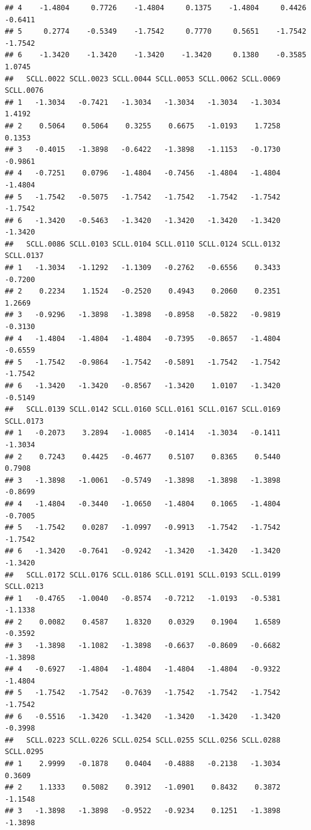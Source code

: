 \documentclass[
]{article}
\begin{document}
\begin{verbatim}
## 4    -1.4804     0.7726    -1.4804     0.1375    -1.4804     0.4426   -0.6411
## 5     0.2774    -0.5349    -1.7542     0.7770     0.5651    -1.7542   -1.7542
## 6    -1.3420    -1.3420    -1.3420    -1.3420     0.1380    -0.3585    1.0745
##   SCLL.0022 SCLL.0023 SCLL.0044 SCLL.0053 SCLL.0062 SCLL.0069 SCLL.0076
## 1   -1.3034   -0.7421   -1.3034   -1.3034   -1.3034   -1.3034    1.4192
## 2    0.5064    0.5064    0.3255    0.6675   -1.0193    1.7258    0.1353
## 3   -0.4015   -1.3898   -0.6422   -1.3898   -1.1153   -0.1730   -0.9861
## 4   -0.7251    0.0796   -1.4804   -0.7456   -1.4804   -1.4804   -1.4804
## 5   -1.7542   -0.5075   -1.7542   -1.7542   -1.7542   -1.7542   -1.7542
## 6   -1.3420   -0.5463   -1.3420   -1.3420   -1.3420   -1.3420   -1.3420
##   SCLL.0086 SCLL.0103 SCLL.0104 SCLL.0110 SCLL.0124 SCLL.0132 SCLL.0137
## 1   -1.3034   -1.1292   -1.1309   -0.2762   -0.6556    0.3433   -0.7200
## 2    0.2234    1.1524   -0.2520    0.4943    0.2060    0.2351    1.2669
## 3   -0.9296   -1.3898   -1.3898   -0.8958   -0.5822   -0.9819   -0.3130
## 4   -1.4804   -1.4804   -1.4804   -0.7395   -0.8657   -1.4804   -0.6559
## 5   -1.7542   -0.9864   -1.7542   -0.5891   -1.7542   -1.7542   -1.7542
## 6   -1.3420   -1.3420   -0.8567   -1.3420    1.0107   -1.3420   -0.5149
##   SCLL.0139 SCLL.0142 SCLL.0160 SCLL.0161 SCLL.0167 SCLL.0169 SCLL.0173
## 1   -0.2073    3.2894   -1.0085   -0.1414   -1.3034   -0.1411   -1.3034
## 2    0.7243    0.4425   -0.4677    0.5107    0.8365    0.5440    0.7908
## 3   -1.3898   -1.0061   -0.5749   -1.3898   -1.3898   -1.3898   -0.8699
## 4   -1.4804   -0.3440   -1.0650   -1.4804    0.1065   -1.4804   -0.7005
## 5   -1.7542    0.0287   -1.0997   -0.9913   -1.7542   -1.7542   -1.7542
## 6   -1.3420   -0.7641   -0.9242   -1.3420   -1.3420   -1.3420   -1.3420
##   SCLL.0172 SCLL.0176 SCLL.0186 SCLL.0191 SCLL.0193 SCLL.0199 SCLL.0213
## 1   -0.4765   -1.0040   -0.8574   -0.7212   -1.0193   -0.5381   -1.1338
## 2    0.0082    0.4587    1.8320    0.0329    0.1904    1.6589   -0.3592
## 3   -1.3898   -1.1082   -1.3898   -0.6637   -0.8609   -0.6682   -1.3898
## 4   -0.6927   -1.4804   -1.4804   -1.4804   -1.4804   -0.9322   -1.4804
## 5   -1.7542   -1.7542   -0.7639   -1.7542   -1.7542   -1.7542   -1.7542
## 6   -0.5516   -1.3420   -1.3420   -1.3420   -1.3420   -1.3420   -0.3998
##   SCLL.0223 SCLL.0226 SCLL.0254 SCLL.0255 SCLL.0256 SCLL.0288 SCLL.0295
## 1    2.9999   -0.1878    0.0404   -0.4888   -0.2138   -1.3034    0.3609
## 2    1.1333    0.5082    0.3912   -1.0901    0.8432    0.3872   -1.1548
## 3   -1.3898   -1.3898   -0.9522   -0.9234    0.1251   -1.3898   -1.3898

\end{verbatim}
\end{document}
